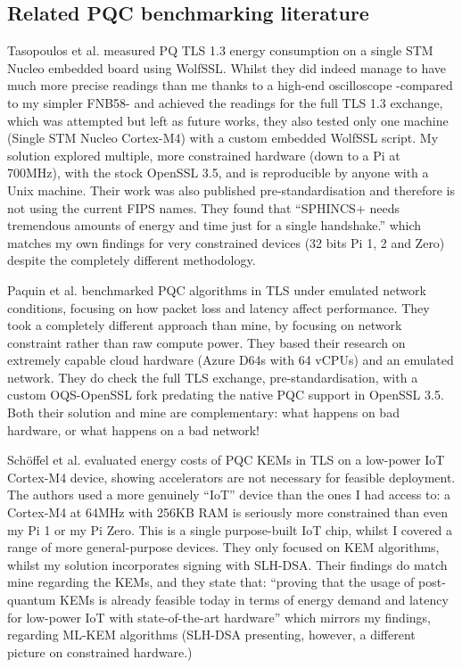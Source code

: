 \documentclass[11pt, letterpaper]{article}
\begin{document}
\subsection{Related PQC benchmarking literature}
Tasopoulos et al. \cite{tasopoulos2023energy} measured PQ TLS 1.3 energy consumption on a single STM Nucleo embedded board using WolfSSL. Whilst they did indeed manage to have much more precise readings than me thanks to a high-end oscilloscope -compared to my simpler FNB58- and achieved the readings for the full TLS 1.3 exchange, which was attempted but left as future works, they also tested only one machine (Single STM Nucleo Cortex-M4) with a custom embedded WolfSSL script. My solution explored multiple, more constrained hardware (down to a Pi at 700MHz), with the stock OpenSSL 3.5, and is reproducible by anyone with a Unix machine. Their work was also published pre-standardisation and therefore is not using the current FIPS names. They found that “SPHINCS+ needs tremendous amounts of energy and time just for a single handshake.” which matches my own findings for very constrained devices (32 bits Pi 1, 2 and Zero) despite the completely different methodology.

Paquin et al. \cite{paquin2020benchmarking} benchmarked PQC algorithms in TLS under emulated network conditions, focusing on how packet loss and latency affect performance. They took a completely different approach than mine, by focusing on network constraint rather than raw compute power. They based their research on extremely capable cloud hardware (Azure D64s with 64 vCPUs) and an emulated network. They do check the full TLS exchange, pre-standardisation, with a custom OQS-OpenSSL fork predating the native PQC support in OpenSSL 3.5. Both their solution and mine are complementary: what happens on bad hardware, or what happens on a bad network!

Schöffel et al. \cite{schoffel2021energy} evaluated energy costs of PQC KEMs in TLS on a low-power IoT Cortex-M4 device, showing accelerators are not necessary for feasible deployment. The authors used a more genuinely “IoT” device than the ones I had access to: a Cortex-M4 at 64MHz with 256KB RAM is seriously more constrained than even my Pi 1 or my Pi Zero. This is a single purpose-built IoT chip, whilst I covered a range of more general-purpose devices. They only focused on KEM algorithms, whilst my solution incorporates signing with SLH-DSA. Their findings do match mine regarding the KEMs, and they state that: “proving that the usage of post-quantum KEMs is already feasible today in terms of energy demand and latency for low-power IoT with state-of-the-art hardware” which mirrors my findings, regarding ML-KEM algorithms (SLH-DSA presenting, however, a different picture on constrained hardware.)
\end{document}
